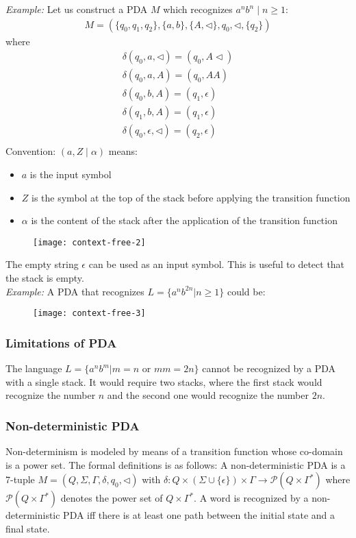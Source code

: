 \textit{Example:} Let us construct a PDA $M$ which recognizes $a^n b^n \mid n \geq 1$:
\begin{align*}
  M = (\{q_0, q_1, q_2\}, \{a,b\}, \{A,\triangleleft\}, q_0, \triangleleft, \{q_2\})
\end{align*}
where
\begin{align*}
  \delta(q_0, a, \triangleleft) = (q_0, A\triangleleft)\\
  \delta(q_0, a, A) = (q_0, AA)\\
  \delta(q_0, b, A) = (q_1, \epsilon)\\
  \delta(q_1, b, A) = (q_1, \epsilon)\\
  \delta(q_0, \epsilon, \triangleleft) = (q_2, \epsilon)\\
\end{align*}
Convention: $(a, Z \mid \alpha)$ means:
\begin{itemize}
  \item $a$ is the input symbol
  \item $Z$ is the symbol at the top of the stack before applying the transition function
  \item $\alpha$ is the content of the stack after the application of the transition function
\end{itemize}
\begin{figure}[H]
  \centering
  \texttt{[image: context-free-2]}
\end{figure}
The empty string $\epsilon$ can be used as an input symbol. This is useful to detect that the stack 
is empty.\\

\textit{Example: } A PDA that recognizes $L = \{a^n b^{2n} | n \geq 1\}$ could be:
\begin{figure}[H]
  \centering
  \texttt{[image: context-free-3]}
\end{figure}
\subsubsection{Limitations of PDA}
The language $L = \{a^n b^m | m = n \text{ or } mm = 2n\}$ cannot be recognized
by a PDA with a single stack. It would require two stacks, where the first 
stack would recognize the number $n$ and the second one would recognize the number $2n$.

\subsubsection{Non-deterministic PDA}
Non-determinism is modeled by means of a transition function whose co-domain is a power set.
The formal definitions is as follows: A non-deterministic PDA is a 7-tuple $M = (Q,\Sigma,\Gamma,\delta,q_0,\triangleleft)$
with $\delta: Q \times (\Sigma \cup \{\epsilon\}) \times \Gamma \rightarrow \mathcal{P}(Q \times \Gamma^{*})$
where $\mathcal{P}(Q \times \Gamma^{*})$ denotes the power set of $Q \times \Gamma^{*}$.
A word is recognized by a non-deterministic PDA iff there is at least one path between the 
initial state and a final state.\\

